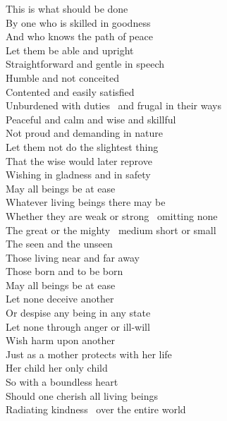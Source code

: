 \begin{english-only}
  This is what should be done\\
  By one who is skilled in goodness\\
  And who knows the path of peace\\
  Let them be able and upright\\
  Straightforward and gentle in speech\\
  Humble and not conceited\\
  Contented and easily satisfied\\
  Unburdened with duties \breathmark\ and frugal in their ways\\
  Peaceful and calm and wise and skillful\\
  Not proud and demanding in nature\\
  Let them not do the slightest thing\\
  That the wise would later reprove\\
  Wishing in gladness and in safety\\
  May all beings be at ease\\
  Whatever living beings there may be\\
  Whether they are weak or strong \breathmark\ omitting none\\
  The great or the mighty \breathmark\ medium short or small\\
  The seen and the unseen\\
  Those living near and far away\\
  Those born and to be born\\
  May all beings be at ease\\
  Let none deceive another\\
  Or despise any being in any state\\
  Let none through anger or ill-will\\
  Wish harm upon another\\
  Just\makeatletter\hyperlink{endnote49-appendix}\makeatother
  as a mother protects with her life\\
  Her child her only child\\
  So with a boundless heart\\
  Should one cherish all living beings\\
  Radiating kindness \breathmark\ over the entire world\\

\end{english-only}
